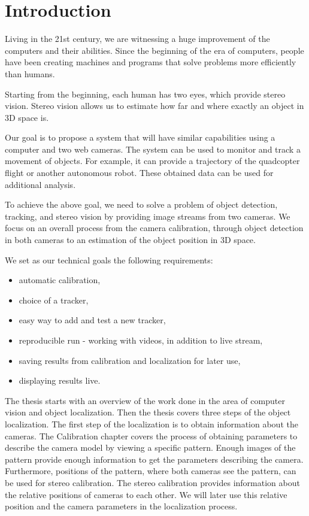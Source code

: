 \chapter*{Introduction}

Living in the 21st century, we are witnessing a huge improvement of the
computers and their abilities. Since the beginning of the era of computers,
people have been creating machines and programs that solve problems more
efficiently than humans.

Starting from the beginning, each human has two eyes, which provide stereo
vision. Stereo vision allows us to estimate how far and where exactly an object
in 3D space is.

Our goal is to propose a system that will have similar capabilities using a
computer and two web cameras. The system can be used to monitor and track a
movement of objects. For example, it can provide a trajectory of the quadcopter
flight or another autonomous robot. These obtained data can be used for
additional analysis.

To achieve the above goal, we need to solve a problem of object detection,
tracking, and stereo vision by providing image streams from two cameras. We
focus on an overall process from the camera calibration, through object
detection in both cameras to an estimation of the object position in 3D space.

We set as our technical goals the following requirements:
\begin{itemize}
\item automatic calibration,
\item choice of a tracker,
\item easy way to add and test a new tracker,
\item reproducible run - working with videos, in addition to live stream,
\item saving results from calibration and localization for later use,
\item displaying results live.
\end{itemize}

The thesis starts with an overview of the work done in the area of computer
vision and object localization. Then the thesis covers three steps of the
object localization. The first step of the localization is to obtain
information about the cameras. The Calibration chapter covers the process of
obtaining parameters to describe the camera model by viewing a specific
pattern. Enough images of the pattern provide enough information to get the
parameters describing the camera. Furthermore, positions of the pattern, where
both cameras see the pattern, can be used for stereo calibration. The stereo
calibration provides information about the relative positions of cameras to
each other. We will later use this relative position and the camera parameters
in the localization process.

